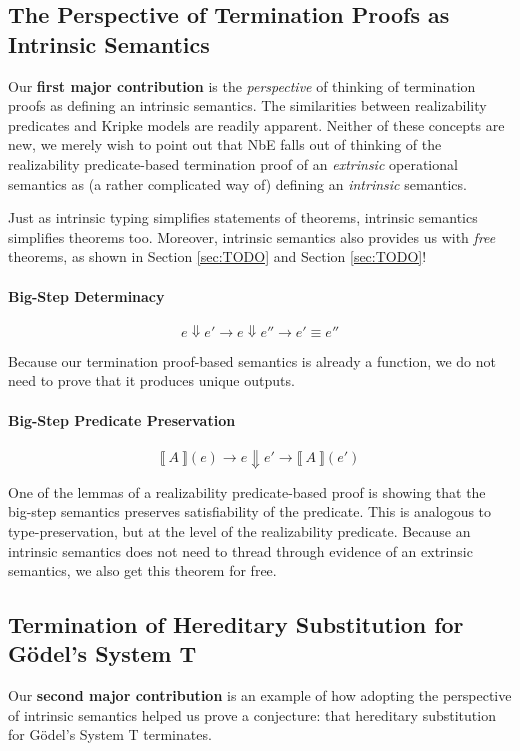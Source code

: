 \documentclass[preprint,nonatbib]{sigplanconf}
\numberwithin{mysubdfn}{mydfn}
\newcommand{\refsec}[1]{Section \ref{sec:#1}}
\def\bigstep{\Downarrow}
\def\marr{\rightarrow}
\newcommand{\el}[1]{\llbracket ~ #1 ~ \rrbracket}
\begin{document}
\subsection{The Perspective of Termination Proofs as Intrinsic Semantics}

Our {\bf first major contribution} is the {\it perspective} of thinking of
termination proofs as defining an intrinsic semantics.
The similarities between realizability predicates and Kripke models are
readily apparent. Neither of these concepts are new, we merely wish
to point out that NbE falls out of thinking of the
realizability predicate-based termination proof of an {\it extrinsic}
operational semantics as (a rather complicated way of) defining an {\it intrinsic}
semantics.

Just as intrinsic typing simplifies statements of theorems, intrinsic semantics simplifies
theorems too. Moreover, intrinsic semantics also provides us with
{\it free} theorems, as shown in \refsec{TODO} and \refsec{TODO}!

\paragraph{Big-Step Determinacy}

$$
e \bigstep e' \marr e \bigstep e'' \marr e' \equiv e''
$$

Because our termination proof-based semantics is already a function,
we do not need to prove that it produces unique outputs.

\paragraph{Big-Step Predicate Preservation}

$$
\el{A}(e) \marr e \bigstep e' \marr \el{A}(e')
$$

One of the lemmas of a realizability predicate-based proof is showing that
the big-step semantics preserves satisfiability
of the predicate. This is analogous to type-preservation, but at the
level of the realizability predicate. Because an intrinsic semantics
does not need to thread through evidence of an extrinsic semantics, we
also get this theorem for free.

\subsection{Termination of Hereditary Substitution for G{\"o}del's System T}

Our {\bf second major contribution} is an example of how adopting the
perspective of intrinsic semantics helped us prove a conjecture:
that hereditary substitution for G{\"o}del's System T terminates.
\end{document}
